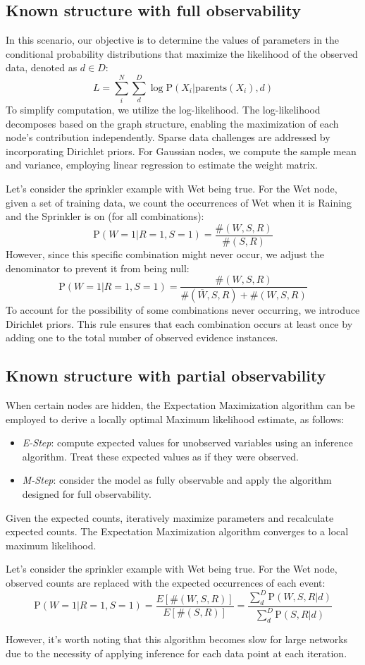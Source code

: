 \subsection{Known structure with full observability}
In this scenario, our objective is to determine the values of parameters in the conditional probability distributions that maximize the likelihood of the observed data, denoted as $d \in D$: 
\[L=\sum_i^N\sum_d^D \log \text{P}(X_i|\text{parents}(X_i),d)\]
To simplify computation, we utilize the log-likelihood. 
The log-likelihood decomposes based on the graph structure, enabling the maximization of each node's contribution independently. 
Sparse data challenges are addressed by incorporating Dirichlet priors.
For Gaussian nodes, we compute the sample mean and variance, employing linear regression to estimate the weight matrix.
\begin{example}
    Let's consider the sprinkler example with Wet being true.
    For the Wet node, given a set of training data, we count the occurrences of Wet when it is Raining and the Sprinkler is on (for all combinations):
    \[\text{P}(W=1|R=1,S=1)=\dfrac{\#(W,S,R)}{\#(S,R)}\]
    However, since this specific combination might never occur, we adjust the denominator to prevent it from being null:
    \[\text{P}(W=1|R=1,S=1)=\dfrac{\#(W,S,R)}{\#(\overline{W},S,R)+\#(W,S,R)}\]
    To account for the possibility of some combinations never occurring, we introduce Dirichlet priors. 
    This rule ensures that each combination occurs at least once by adding one to the total number of observed evidence instances.
\end{example}

\subsection{Known structure with partial observability}
When certain nodes are hidden, the Expectation Maximization algorithm can be employed to derive a locally optimal Maximum likelihood estimate, as follows:
\begin{itemize}
    \item \textit{E-Step}: compute expected values for unobserved variables using an inference algorithm. 
        Treat these expected values as if they were observed.
    \item \textit{M-Step}: consider the model as fully observable and apply the algorithm designed for full observability.
\end{itemize}
Given the expected counts, iteratively maximize parameters and recalculate expected counts. 
The Expectation Maximization algorithm converges to a local maximum likelihood.
\begin{example}
    Let's consider the sprinkler example with Wet being true. 
    For the Wet node, observed counts are replaced with the expected occurrences of each event:
    \[\text{P}(W=1|R=1,S=1)=\dfrac{E\left[\#(W,S,R)\right]}{E\left[\#(S,R)\right]}=\dfrac{\sum_d^D\text{P}(W,S,R|d)}{\sum_d^D\text{P}(S,R|d)}\]
\end{example}
However, it's worth noting that this algorithm becomes slow for large networks due to the necessity of applying inference for each data point at each iteration.

